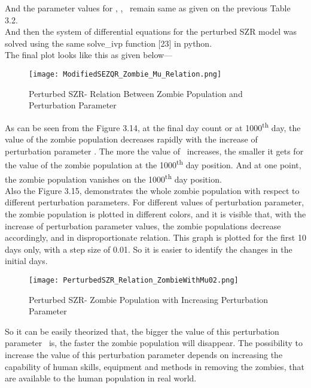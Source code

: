 And the parameter values for \textbeta, \textalpha, \textzeta \ remain same as given on the previous Table 3.2. \\

And then the system of differential equations for the perturbed SZR model was solved using the same solve\_ivp function [23] in python. \\

The final plot looks like this as given below--- \\

\begin{figure}[H]
\centering
\texttt{[image: ModifiedSEZQR\_Zombie\_Mu\_Relation.png]}
\caption{Perturbed SZR- Relation Between Zombie Population and Perturbation Parameter}
\label{fig:Perturbed SZR Zombie-Mu Relation 01}
\end{figure}

As can be seen from the Figure 3.14, at the final day count or at 1000\textsuperscript{th} day, the value of the zombie population decreases rapidly with the increase of perturbation parameter \textmu. The more the value of \textmu \ increases, the smaller it gets for the value of the zombie population at the 1000\textsuperscript{th} day position. And at one point, the zombie population vanishes on the 1000\textsuperscript{th} day position. \\

Also the Figure 3.15, demonstrates the whole zombie population with respect to different perturbation parameters. For different values of perturbation parameter, the zombie population is plotted in different colors, and it is visible that, with the increase of perturbation parameter values, the zombie populations decrease accordingly, and in disproportionate relation. This graph is plotted for the first 10 days only, with a step size of 0.01. So it is easier to identify the changes in the initial days. \\

\begin{figure}[H]
\centering
\texttt{[image: PerturbedSZR\_Relation\_ZombieWithMu02.png]}
\caption{Perturbed SZR- Zombie Population with Increasing Perturbation Parameter}
\label{fig:Perturbed SZR Zombie-Mu Relation 02}
\end{figure}

So it can be easily theorized that, the bigger the value of this perturbation parameter \textmu \ is, the faster the zombie population will disappear. The possibility to increase the value of this perturbation parameter depends on increasing the capability of human skills, equipment and methods in removing the zombies, that are available to the human population in real world. \\